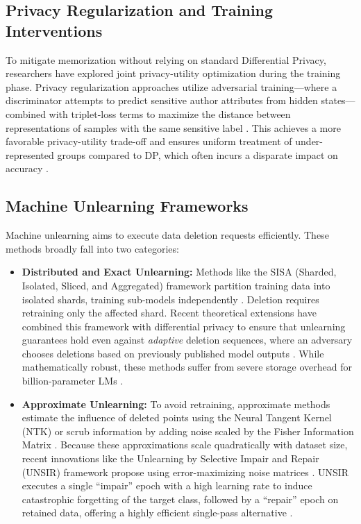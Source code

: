 \documentclass[11pt]{article}
\begin{document}
\subsection{Privacy Regularization and Training Interventions}

To mitigate memorization without relying on standard Differential Privacy, researchers have explored joint privacy-utility optimization during the training phase. Privacy regularization approaches utilize adversarial training---where a discriminator attempts to predict sensitive author attributes from hidden states---combined with triplet-loss terms to maximize the distance between representations of samples with the same sensitive label \citep{mireshghallah2021privacy}. This achieves a more favorable privacy-utility trade-off and ensures uniform treatment of under-represented groups compared to DP, which often incurs a disparate impact on accuracy \citep{bagdasaryan2019differential}.

\subsection{Machine Unlearning Frameworks}

Machine unlearning aims to execute data deletion requests efficiently. These methods broadly fall into two categories:
\begin{itemize}
    \item \textbf{Distributed and Exact Unlearning:} Methods like the SISA (Sharded, Isolated, Sliced, and Aggregated) framework partition training data into isolated shards, training sub-models independently \citep{bourtoule2021machine}. Deletion requires retraining only the affected shard. Recent theoretical extensions have combined this framework with differential privacy to ensure that unlearning guarantees hold even against \textit{adaptive} deletion sequences, where an adversary chooses deletions based on previously published model outputs \citep{gupta2021adaptive}. While mathematically robust, these methods suffer from severe storage overhead for billion-parameter LMs \citep{tarun2023fast}.
    \item \textbf{Approximate Unlearning:} To avoid retraining, approximate methods estimate the influence of deleted points using the Neural Tangent Kernel (NTK) or scrub information by adding noise scaled by the Fisher Information Matrix \citep{golatkar2020eternal}. Because these approximations scale quadratically with dataset size, recent innovations like the Unlearning by Selective Impair and Repair (UNSIR) framework propose using error-maximizing noise matrices \citep{tarun2023fast}. UNSIR executes a single ``impair'' epoch with a high learning rate to induce catastrophic forgetting of the target class, followed by a ``repair'' epoch on retained data, offering a highly efficient single-pass alternative \citep{tarun2023fast}.
\end{itemize}
\end{document}
